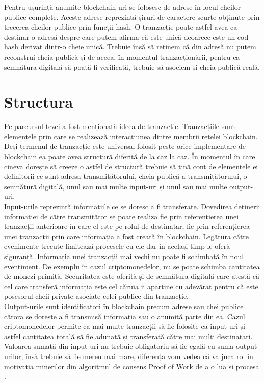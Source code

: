 Pentru ușurință anumite blockchain-uri se folosesc de adrese în locul cheilor publice complete. Aceste adrese reprezintă șiruri de caractere scurte obținute prin trecerea cheilor publice prin funcții hash. O tranzacție poate astfel avea ca destinar o adresă despre care putem afirma că este unică deoarece este un cod hash derivat dintr-o cheie unică. Trebuie însă să reținem că din adresă nu putem reconstrui cheia publică și de aceea, în momentul tranzacționării, pentru ca semnătura digitală să poată fi verificată, trebuie să asociem și cheia publică reală.\\ 

\clearpage

\section{Structura}

Pe parcursul tezei a fost menționată ideea de tranzacție. Tranzacțiile sunt elementele prin care se realizează interacțiunea dintre membrii rețelei blockchain.\\

Deși termenul de tranzacție este universal folosit peste orice implementare de blockchain ea poate avea structură diferită de la caz la caz. În momentul în care cineva dorește să creeze o astfel de structură trebuie să țină cont de elementele ei definitorii ce sunt adresa transmițătorului, cheia publică a transmițătorului, o semnătură digitală, unul sau mai multe input-uri și unul sau mai multe output-uri.\\

Input-urile reprezintă informațiile ce se doresc a fi transferate. Dovedirea deținerii informației de către transmițător se poate realiza fie prin referențierea unei tranzacții anterioare în care el este pe rolul de destinatar, fie prin referențierea unei tranzacții prin care informația a fost creată în blockchain.
Legătura către evenimente trecute limitează procesele cu ele dar în același timp le oferă siguranță. Informația unei tranzacții mai vechi nu poate fi schimbată în noul eventiment. De exemplu în cazul criptomonedelor, nu se poate schimba cantitatea de monezi primită. Securitatea este oferită și de semnătura digitală care atestă că cel care transferă informația este cel căruia ii aparține cu adevărat pentru că este posesorul cheii private asociate celei publice din tranzacție.\\

Output-urile sunt identificatori în blockchain precum adrese sau chei publice cărora se dorește a fi transmisă informația sau o anumită parte din ea. Cazul criptomonedelor permite ca mai multe tranzacții să fie folosite ca input-uri și astfel cantitatea totală să fie adunată și transferată către mai mulți destinatari. Valoarea sumată din input-uri nu trebuie obligatoriu să fie egală cu suma output-urilor, însă trebuie să fie mereu mai mare, diferența vom vedea că va juca rol în motivația minerilor din algoritmul de consens Proof of Work de a o lua și procesa \cite{Blockchain_Overview_IEEE}.\\

